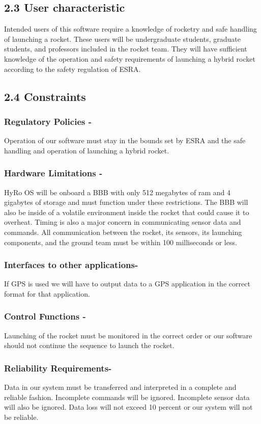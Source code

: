 \documentclass[10pt,draftclsnofoot,onecolumn]{IEEEtran}
\begin{document}
\subsection{2.3 User characteristic}
Intended users of this software require a knowledge of rocketry and safe handling of launching a rocket. These users will be undergraduate students, graduate students, and professors included in the rocket team. They will have sufficient knowledge of the operation and safety requirements of launching a hybrid rocket according to the safety regulation of ESRA.

\subsection{2.4 Constraints}
\subsubsection{ Regulatory Policies -} Operation of our software must stay in the bounds set by ESRA and the safe handling and operation of launching a hybrid rocket.  
\subsubsection{ Hardware Limitations -}HyRo OS will be onboard a BBB with only 512 megabytes of ram and 4 gigabytes of storage and must function under these restrictions. The BBB will also be inside of a volatile environment inside the rocket that could cause it to overheat. Timing is also a major concern in communicating sensor data and commands. All communication between the rocket, its sensors, its launching components, and the ground team must be within 100 milliseconds or less.
\subsubsection{ Interfaces to other applications-} If GPS is used we will have to output data to a GPS application in the correct format for that application.
\subsubsection{Control Functions -} Launching of the rocket must be monitored in the correct order or our software should not continue the sequence to launch the rocket.
\subsubsection{Reliability Requirements-} Data in our system must be transferred and interpreted in a complete and reliable fashion. Incomplete commands will be ignored. Incomplete sensor data will also be ignored. Data loss will not exceed 10 percent or our system will not be reliable.
\end{document}
